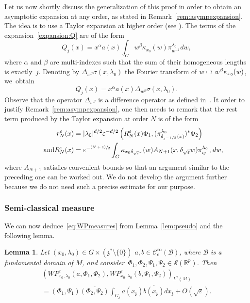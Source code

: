 \documentclass[JEP,XML,SOM,Unicode,published]{cedram}
\let\mathcal\mathscr
\newcommand\mto{\mathchoice{\longmapsto}{\mapsto}{\mapsto}{\mapsto}}
\newcommand{\psfrac}[2]{\sfrac{(#1)}{#2}}
\theoremstyle{plain}
\newtheorem{lemma}[theorem]{Lemma}
\theoremstyle{definition}
\let\eps\varepsilon
\def\R{{\mathbb R}}
\begin{document}
Let us now shortly discuss the generalization of this proof in order to obtain an asymptotic expansion at any order, as stated in Remark~\ref{rem:asympexpansion}. The idea is to use a Taylor expansion at higher order (see \cite[\S3.1.8]{FR}). The terms of the expansion~\eqref{expansion:Q} are of the form
\[
Q_j(x)= x^\alpha a(x) \int_{G} w^\beta \kappa_{x_0}(w)\pi_{ w^{-1} }^{\lambda_0} dw,
\]
where $\alpha$ and $\beta$ are multi-indexes such that the sum of their homogeneous lengths is exactly~$j$.
Denoting by $\Delta_{w^\beta} \sigma(x,\lambda_0)$ the Fourier transform of $w\mto w^\beta \kappa_{x_0}(w)$, we~obtain
\[
Q_j(x)= x^\alpha a(x) \Delta_{w^\beta} \sigma(x,\lambda_0).
\]
Observe that the operator $\Delta_{w^\beta}$ is a difference operator as defined in~\cite{FR}.
It order to justify Remark~\ref{rem:asympexpansion}, one then needs to remark that the rest term produced by the Taylor expansion at order $N$ is of the form
\begin{align*}
r^\eps_N(x)&=
|\lambda_0|^{d/2}\eps^{-d/2} \left(R^\eps_N(x) \Phi_1,
(\pi^{\lambda_0}_{\delta_{\eps^{-1/2} }(x)})^*\Phi_2\right)
\\
\tag*{and}
R^\eps_N(x)&=\eps^{-\psfrac {N+1}2} \int_{G} \kappa_{x_0\delta_{\sqrt\eps} x}(w)
A_{N+1} (x, \delta_{\sqrt\eps} w)
\pi_{ w^{-1} }^{\lambda_0} dw,
\end{align*}
where $A_{N+1}$ satisfies convenient bounds so that an argument similar to the preceding one can be worked out. We do not develop the argument further because we do not need such a precise estimate for our purpose.

\subsubsection{Semi-classical measure}
We can now deduce~\eqref{eq:WPmeasures} from Lemma~\ref{lem:pseudo} and the following lemma.

\begin{lemma}\label{lem:WP2}
Let $(x_0,\lambda_0)\in G\times (\mathfrak z^*\setminus\{0\})$ $a,b\in\mathcal C^\infty_c(\mathcal B)$, where $\mathcal B$ is a fundamental domain of $M$, and consider~$\Phi_1,\Phi_2, \Psi_1,\Psi_2\in\mathcal S(\R^p)$.
Then
\begin{multline*}
\left(WP^\eps_{x_0,\lambda_0} (a,\Phi_1,\Phi_2),WP^\eps_{x_0,\lambda_0} (b,\Psi_1,\Psi_2)\right)_{L^2(M)}\\
=(\Phi_1,\Psi_1)\overline{(\Phi_2,\Psi_2)}
\int_{G_{\mathfrak z}} a(x_{\mathfrak z}) \overline{b(x_{\mathfrak z}) } dx_{\mathfrak z}
+O(\sqrt\eps).
\end{multline*}
\end{lemma}
\end{document}

